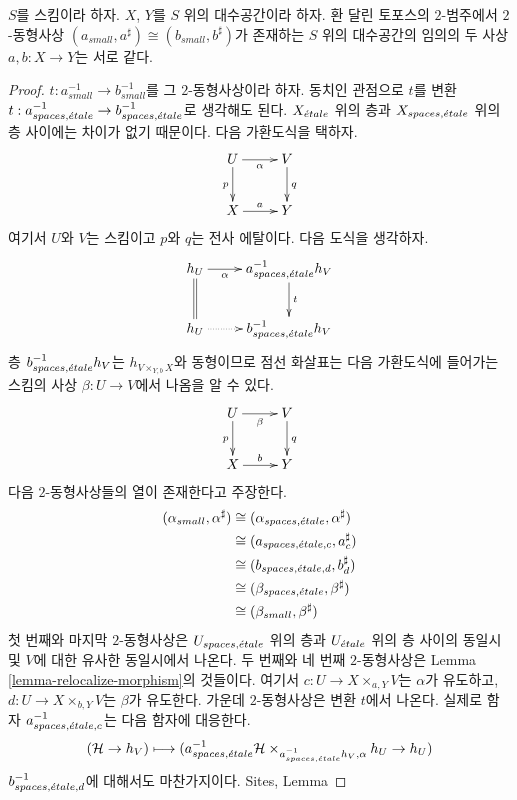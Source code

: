 \begin{lemma}
\label{lemma-faithful}
$S$를 스킴이라 하자.
$X$, $Y$를 $S$ 위의 대수공간이라 하자.
환 달린 토포스의 $2$-범주에서 $2$-동형사상
$(a_{small}, a^\sharp) \cong (b_{small}, b^\sharp)$가 존재하는
$S$ 위의 대수공간의 임의의 두 사상 $a, b : X \to Y$는 서로 같다.
\end{lemma}

\begin{proof}
$t : a_{small}^{-1} \to b_{small}^{-1}$를 그 $2$-동형사상이라 하자.
동치인 관점으로 $t$를 변환
$t : a_{spaces, {\acute{e}tale}}^{-1} \to b_{spaces, {\acute{e}tale}}^{-1}$로 생각해도 된다.
$X_{\acute{e}tale}$ 위의 층과 $X_{spaces, {\acute{e}tale}}$ 위의 층 사이에는 차이가 없기
때문이다. 다음 가환도식을 택하자.
$$
\xymatrix{
U \ar[d]_p \ar[r]_\alpha  & V \ar[d]^q \\
X \ar[r]^a & Y
}
$$
여기서 $U$와 $V$는 스킴이고 $p$와 $q$는 전사 에탈이다.
다음 도식을 생각하자.
$$
\xymatrix{
h_U \ar[r]_-\alpha \ar@{=}[d] & a_{spaces, \etale}^{-1}h_V \ar[d]^t \\
h_U \ar@{..>}[r] & b_{spaces, \etale}^{-1}h_V
}
$$
층 $b_{spaces, {\acute{e}tale}}^{-1}h_V$는 $h_{V \times_{Y, b} X}$와
동형이므로 점선 화살표는 다음 가환도식에 들어가는 스킴의 사상
$\beta : U \to V$에서 나옴을 알 수 있다.
$$
\xymatrix{
U \ar[d]_p \ar[r]_\beta  & V \ar[d]^q \\
X \ar[r]^b & Y
}
$$
다음 $2$-동형사상들의 열이 존재한다고 주장한다.
\begin{align*}
(\alpha_{small}, \alpha^\sharp)
& \cong
(\alpha_{spaces, {\acute{e}tale}}, \alpha^\sharp) \\
& \cong
(a_{spaces, {\acute{e}tale}, c}, a_c^\sharp) \\
& \cong
(b_{spaces, {\acute{e}tale}, d}, b_d^\sharp) \\
& \cong
(\beta_{spaces, {\acute{e}tale}}, \beta^\sharp) \\
& \cong
(\beta_{small}, \beta^\sharp)
\end{align*}
첫 번째와 마지막 $2$-동형사상은 $U_{spaces, {\acute{e}tale}}$ 위의 층과
$U_{\acute{e}tale}$ 위의 층 사이의 동일시 및 $V$에 대한 유사한 동일시에서
나온다. 두 번째와 네 번째 $2$-동형사상은 Lemma
\ref{lemma-relocalize-morphism}의 것들이다. 여기서
$c : U \to X \times_{a, Y} V$는 $\alpha$가 유도하고,
$d : U \to X \times_{b, Y} V$는 $\beta$가 유도한다.
가운데 $2$-동형사상은 변환 $t$에서 나온다. 실제로 함자
$a_{spaces, {\acute{e}tale}, c}^{-1}$는 다음 함자에 대응한다.
$$
(\mathcal{H} \to h_V) \longmapsto
(a_{spaces, {\acute{e}tale}}^{-1}\mathcal{H}
\times_{a_{spaces, {\acute{e}tale}}^{-1}h_V, \alpha}
h_U \to
h_U)
$$
$b_{spaces, {\acute{e}tale}, d}^{-1}$에 대해서도 마찬가지이다. Sites, Lemma

\end{proof}
